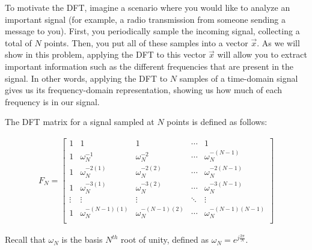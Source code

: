 

To motivate the DFT, imagine a scenario where you would like to analyze an important signal
(for example, a radio transmission from someone sending a message to you).
First, you periodically sample the incoming signal, collecting a total of $N$
points. Then, you put all of these samples into a vector $\vec{x}$. As we will show in this
problem, applying the DFT to this vector $\vec{x}$ will allow you to extract important information such as
the different frequencies that are present in the signal. In other words, applying the DFT to $N$ samples
of a time-domain signal gives us its frequency-domain representation, showing us how much of each frequency is in our signal.


The DFT matrix for a signal sampled at $N$ points is defined as follows:

\begin{align*}
F_N = 
\begin{bmatrix}
1 & 1 & 1 & \cdots & 1 \\
1 & \omega_N^{-1} & \omega_N^{-2} & \cdots & \omega_N^{-(N-1)} \\
1 & \omega_N^{-2(1)} & \omega_N^{-2(2)} & \cdots & \omega_N^{-2(N-1)} \\
1 & \omega_N^{-3(1)} & \omega_N^{-3(2)} & \cdots & \omega_N^{-3(N-1)} \\
\vdots & \vdots & \vdots  & \ddots & \vdots \\
1 & \omega_N^{-(N-1)(1)} & \omega_N^{-(N-1)(2)} & \cdots & \omega_N^{-(N-1)(N-1)} \\
\end{bmatrix} 
\end{align*}

Recall that $\omega_N$ is the basis $N^{th}$ root of unity, defined as $\omega_N = e^{j\frac{2\pi}{N}}$.

